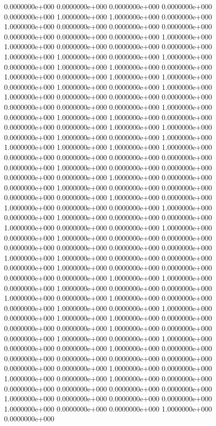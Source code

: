   0.0000000e+000  0.0000000e+000  0.0000000e+000  0.0000000e+000  0.0000000e+000
  1.0000000e+000  1.0000000e+000  0.0000000e+000  1.0000000e+000  0.0000000e+000
  0.0000000e+000  0.0000000e+000  0.0000000e+000  0.0000000e+000  0.0000000e+000
  1.0000000e+000  1.0000000e+000  0.0000000e+000  0.0000000e+000  0.0000000e+000
  1.0000000e+000  1.0000000e+000  0.0000000e+000  1.0000000e+000  0.0000000e+000
  1.0000000e+000  1.0000000e+000  0.0000000e+000  1.0000000e+000  0.0000000e+000
  1.0000000e+000  1.0000000e+000  0.0000000e+000  1.0000000e+000  0.0000000e+000
  1.0000000e+000  1.0000000e+000  0.0000000e+000  0.0000000e+000  0.0000000e+000
  0.0000000e+000  0.0000000e+000  0.0000000e+000  1.0000000e+000  0.0000000e+000
  1.0000000e+000  1.0000000e+000  0.0000000e+000  0.0000000e+000  0.0000000e+000
  1.0000000e+000  1.0000000e+000  0.0000000e+000  1.0000000e+000  0.0000000e+000
  1.0000000e+000  1.0000000e+000  1.0000000e+000  1.0000000e+000  1.0000000e+000
  0.0000000e+000  0.0000000e+000  0.0000000e+000  0.0000000e+000  0.0000000e+000
  1.0000000e+000  0.0000000e+000  0.0000000e+000  0.0000000e+000  0.0000000e+000
  1.0000000e+000  0.0000000e+000  0.0000000e+000  1.0000000e+000  0.0000000e+000
  0.0000000e+000  0.0000000e+000  0.0000000e+000  1.0000000e+000  0.0000000e+000
  1.0000000e+000  0.0000000e+000  0.0000000e+000  1.0000000e+000  0.0000000e+000
  1.0000000e+000  0.0000000e+000  0.0000000e+000  1.0000000e+000  0.0000000e+000
  0.0000000e+000  1.0000000e+000  0.0000000e+000  1.0000000e+000  0.0000000e+000
  0.0000000e+000  0.0000000e+000  0.0000000e+000  0.0000000e+000  0.0000000e+000
  1.0000000e+000  1.0000000e+000  0.0000000e+000  0.0000000e+000  0.0000000e+000
  1.0000000e+000  0.0000000e+000  0.0000000e+000  0.0000000e+000  0.0000000e+000
  1.0000000e+000  1.0000000e+000  0.0000000e+000  1.0000000e+000  0.0000000e+000
  0.0000000e+000  1.0000000e+000  0.0000000e+000  1.0000000e+000  0.0000000e+000
  0.0000000e+000  1.0000000e+000  0.0000000e+000  1.0000000e+000  0.0000000e+000
  1.0000000e+000  1.0000000e+000  0.0000000e+000  0.0000000e+000  0.0000000e+000
  1.0000000e+000  0.0000000e+000  0.0000000e+000  1.0000000e+000  0.0000000e+000
  1.0000000e+000  0.0000000e+000  0.0000000e+000  1.0000000e+000  0.0000000e+000
  0.0000000e+000  0.0000000e+000  0.0000000e+000  0.0000000e+000  0.0000000e+000
  0.0000000e+000  1.0000000e+000  0.0000000e+000  1.0000000e+000  0.0000000e+000
  1.0000000e+000  0.0000000e+000  0.0000000e+000  0.0000000e+000  0.0000000e+000
  0.0000000e+000  1.0000000e+000  0.0000000e+000  0.0000000e+000  0.0000000e+000
  1.0000000e+000  0.0000000e+000  0.0000000e+000  1.0000000e+000  0.0000000e+000
